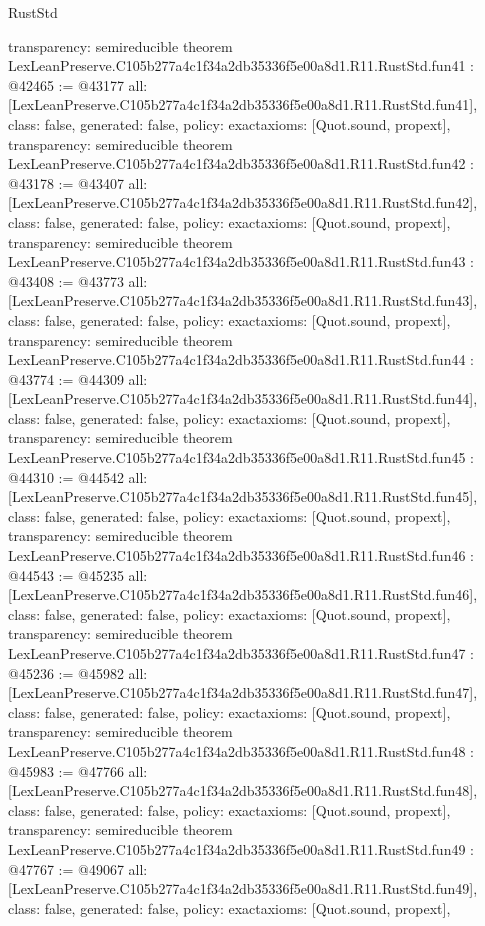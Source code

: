 \begin{lexlean}{RustStd}
\begin{coremodule}
{  transparency: semireducible
}
theorem LexLeanPreserve.C105b277a4c1f34a2db35336f5e00a8d1.R11.RustStd.fun41 : @42465 := @43177 {
  all: [LexLeanPreserve.C105b277a4c1f34a2db35336f5e00a8d1.R11.RustStd.fun41],
  class: false,
  generated: false,
  policy: exact{axioms: [Quot.sound, propext]},
  transparency: semireducible
}
theorem LexLeanPreserve.C105b277a4c1f34a2db35336f5e00a8d1.R11.RustStd.fun42 : @43178 := @43407 {
  all: [LexLeanPreserve.C105b277a4c1f34a2db35336f5e00a8d1.R11.RustStd.fun42],
  class: false,
  generated: false,
  policy: exact{axioms: [Quot.sound, propext]},
  transparency: semireducible
}
theorem LexLeanPreserve.C105b277a4c1f34a2db35336f5e00a8d1.R11.RustStd.fun43 : @43408 := @43773 {
  all: [LexLeanPreserve.C105b277a4c1f34a2db35336f5e00a8d1.R11.RustStd.fun43],
  class: false,
  generated: false,
  policy: exact{axioms: [Quot.sound, propext]},
  transparency: semireducible
}
theorem LexLeanPreserve.C105b277a4c1f34a2db35336f5e00a8d1.R11.RustStd.fun44 : @43774 := @44309 {
  all: [LexLeanPreserve.C105b277a4c1f34a2db35336f5e00a8d1.R11.RustStd.fun44],
  class: false,
  generated: false,
  policy: exact{axioms: [Quot.sound, propext]},
  transparency: semireducible
}
theorem LexLeanPreserve.C105b277a4c1f34a2db35336f5e00a8d1.R11.RustStd.fun45 : @44310 := @44542 {
  all: [LexLeanPreserve.C105b277a4c1f34a2db35336f5e00a8d1.R11.RustStd.fun45],
  class: false,
  generated: false,
  policy: exact{axioms: [Quot.sound, propext]},
  transparency: semireducible
}
theorem LexLeanPreserve.C105b277a4c1f34a2db35336f5e00a8d1.R11.RustStd.fun46 : @44543 := @45235 {
  all: [LexLeanPreserve.C105b277a4c1f34a2db35336f5e00a8d1.R11.RustStd.fun46],
  class: false,
  generated: false,
  policy: exact{axioms: [Quot.sound, propext]},
  transparency: semireducible
}
theorem LexLeanPreserve.C105b277a4c1f34a2db35336f5e00a8d1.R11.RustStd.fun47 : @45236 := @45982 {
  all: [LexLeanPreserve.C105b277a4c1f34a2db35336f5e00a8d1.R11.RustStd.fun47],
  class: false,
  generated: false,
  policy: exact{axioms: [Quot.sound, propext]},
  transparency: semireducible
}
theorem LexLeanPreserve.C105b277a4c1f34a2db35336f5e00a8d1.R11.RustStd.fun48 : @45983 := @47766 {
  all: [LexLeanPreserve.C105b277a4c1f34a2db35336f5e00a8d1.R11.RustStd.fun48],
  class: false,
  generated: false,
  policy: exact{axioms: [Quot.sound, propext]},
  transparency: semireducible
}
theorem LexLeanPreserve.C105b277a4c1f34a2db35336f5e00a8d1.R11.RustStd.fun49 : @47767 := @49067 {
  all: [LexLeanPreserve.C105b277a4c1f34a2db35336f5e00a8d1.R11.RustStd.fun49],
  class: false,
  generated: false,
  policy: exact{axioms: [Quot.sound, propext]},
}
\end{coremodule}
\end{lexlean}
